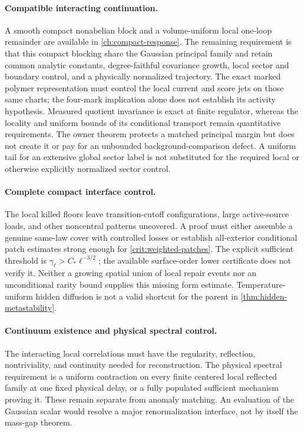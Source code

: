 \documentclass[11pt,oneside,openany]{book}
\theoremstyle{definition}
\theoremstyle{remark}
\begin{document}
\paragraph{Compatible interacting continuation.}
A smooth compact nonabelian block and a volume-uniform local one-loop
remainder are available in \cref{ch:compact-response}. The remaining
requirement is that this compact blocking share the Gaussian principal family
and retain common analytic constants, degree-faithful covariance growth,
local sector and boundary control, and a physically normalized trajectory.
The exact marked polymer representation must control the local current
and score jets on those same charts; the four-mark implication alone
does not establish its activity hypothesis. Measured quotient invariance
is exact at finite regulator, whereas the locality and uniform bounds of
its conditional transport remain quantitative requirements.
The owner theorem protects a matched principal margin but does not create
it or pay for an unbounded background-comparison defect. A uniform tail
for an extensive global sector label is not substituted for the required
local or otherwise explicitly normalized sector control.

\paragraph{Complete compact interface control.}
The local killed floors leave transition-cutoff configurations, large
active-source loads, and other noncentral patterns uncovered. A proof
must either assemble a genuine same-law cover with controlled losses
or establish all-exterior conditional patch estimates strong enough
for \cref{crit:weighted-patches}. The explicit sufficient threshold is
$\gamma_\ell>C_*\ell^{-3/2}$; the available surface-order lower
certificate does not verify it. Neither a growing spatial union of
local repair events nor an unconditional rarity bound supplies this
missing form estimate. Temperature-uniform hidden diffusion is not a
valid shortcut for the parent in \cref{thm:hidden-metastability}.

\paragraph{Continuum existence and physical spectral control.}
The interacting local correlations must have the regularity, reflection,
nontriviality, and continuity needed for reconstruction. The physical
spectral requirement is a uniform contraction on every finite centered
local reflected family at one fixed physical delay, or a fully populated
sufficient mechanism proving it. These remain separate from anomaly
matching. An evaluation of the Gaussian scalar would resolve a major
renormalization interface, not by itself the mass-gap theorem.
\end{document}
